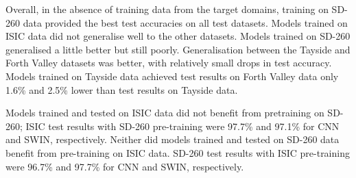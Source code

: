 \begin{table}[h]
	\centering
	\caption{Class-balanced accuracy when training and testing on the various datasets.}
	\label{tab:generalisation_results}
\end{table}

Overall, in the absence of training data from the target domains, training on SD-260 data provided the best test accuracies on all test datasets. Models trained on ISIC data did not generalise well to the other datasets. Models trained on SD-260 generalised a little better but still poorly. Generalisation between the Tayside and Forth Valley datasets was better, with relatively small drops in test accuracy. Models trained on Tayside data achieved test results on Forth Valley data only 1.6\% and 2.5\% lower than test results on Tayside data. 

Models trained and tested on ISIC data did not benefit from pretraining on SD-260; ISIC test results with SD-260 pre-training were 97.7\% and 97.1\% for CNN and SWIN, respectively. Neither did models trained and tested on SD-260 data benefit from pre-training on ISIC data. SD-260 test results with ISIC pre-training were 96.7\% and 97.7\% for CNN and SWIN, respectively.

